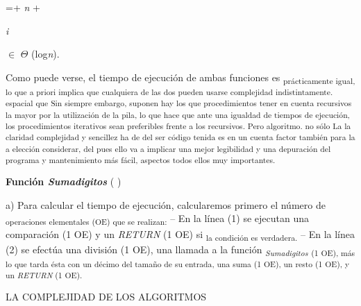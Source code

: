 \documentclass[12pt]{article}
\renewcommand{\_}{\kern-1.5pt\textunderscore\kern-1.5pt}
\begin{document}
{\fontsize{11pt}{13.2pt}\selectfont =+ \textit{n }+ {\fontsize{7pt}{8.4pt}\selectfont \textit{i }\par}\par}\par

{\fontsize{10pt}{12.0pt}\selectfont $ \in $ $ \Theta $ (log\textit{n}). \par}\par

{\fontsize{10pt}{12.0pt}\selectfont Como puede verse, el tiempo de ejecución de ambas funciones es \textsubscript{prácticamente igual, lo que a priori implica que cualquiera de las dos pueden usarse complejidad indistintamente. espacial que Sin siempre embargo, suponen hay los que procedimientos tener en cuenta recursivos la mayor por la utilización de la pila, lo que hace que ante una igualdad de tiempos de ejecución, los procedimientos iterativos sean preferibles frente a los recursivos. Pero algoritmo. no sólo La la claridad complejidad y sencillez ha de del ser código tenida es en un cuenta factor también para la a elección considerar, del pues ello va a implicar una mejor legibilidad y una depuración del programa y mantenimiento más fácil, aspectos todos ellos muy importantes. }\par}\par

{\fontsize{10pt}{12.0pt}\selectfont \textbf{Función \textit{Sumadigitos }}( ) \par}\par

\begin{justify}
{\fontsize{10pt}{12.0pt}\selectfont a) Para calcular el tiempo de ejecución, calcularemos primero el número de \textsubscript{operaciones elementales (OE) que se realizan: }– En la línea (1) se ejecutan una comparación (1 OE) y un \textit{RETURN }(1 OE) si \textsubscript{la condición es verdadera. }– En la línea (2) se efectúa una división (1 OE), una llamada a la función \textit{\textsubscript{Sumadigitos }}\textsubscript{(1 OE), más lo que tarda ésta con un décimo del tamaño de su entrada, una suma (1 OE), un resto (1 OE), y un \textit{RETURN }(1 OE). }\par}
\end{justify}\par

\begin{adjustwidth}{0.58in}{0.57in}
{\fontsize{7pt}{8.4pt}\selectfont LA COMPLEJIDAD DE LOS ALGORITMOS {\fontsize{10pt}{12.0pt} \par}\par}\par

\end{adjustwidth}
\end{document}
